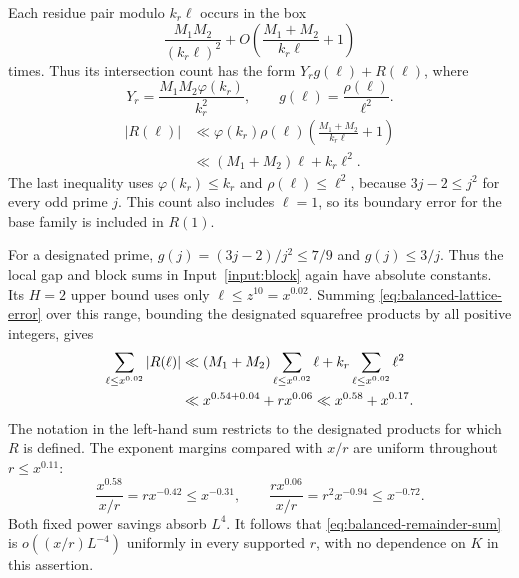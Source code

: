 Each residue pair modulo $k_r\ell$ occurs in the box
\[
 \frac{M_1M_2}{(k_r\ell)^2}
     +O\left(\frac{M_1+M_2}{k_r\ell}+1\right)
\]
times.  Thus its intersection count has the form $Y_rg(\ell)+R(\ell)$,
where
\begin{equation}\label{eq:balanced-sieve-data}
 Y_r=\frac{M_1M_2\varphi(k_r)}{k_r^2},
 \qquad g(\ell)=\frac{\rho(\ell)}{\ell^2}.
\end{equation}
\begin{equation}\label{eq:balanced-lattice-error}
 \begin{split}
 |R(\ell)|
 &\ll\varphi(k_r)\rho(\ell)
       \left(\frac{M_1+M_2}{k_r\ell}+1\right)\\
 &\ll (M_1+M_2)\ell+k_r\ell^2.
 \end{split}
\end{equation}
The last inequality uses $\varphi(k_r)\le k_r$ and
$\rho(\ell)\le\ell^2$, because $3j-2\le j^2$ for every odd prime
$j$.  This count also includes $\ell=1$, so its boundary error for
the base family is included in $R(1)$.

For a designated prime,
$g(j)=(3j-2)/j^2\le7/9$ and $g(j)\le3/j$.  Thus the local gap and
block sums in Input~\ref{input:block} again have absolute constants.
Its $H=2$ upper bound uses only $\ell\le z^{10}=x^{0.02}$.
Summing \eqref{eq:balanced-lattice-error} over this range, bounding
the designated squarefree products by all positive integers, gives
\begin{align}
 \sum_{\ell\le x^{0.02}}|R(\ell)|
 &\ll (M_1+M_2)\sum_{\ell\le x^{0.02}}\ell
        +k_r\sum_{\ell\le x^{0.02}}\ell^2\notag\\
 &\ll x^{0.54+0.04}+r x^{0.06}
 \ll x^{0.58}+x^{0.17}.\label{eq:balanced-remainder-sum}
\end{align}
The notation in the left-hand sum restricts to the designated
products for which $R$ is defined.  The exponent margins compared
with $x/r$ are uniform throughout $r\le x^{0.11}$:
\[
 \frac{x^{0.58}}{x/r}=r x^{-0.42}\le x^{-0.31},
 \qquad
 \frac{r x^{0.06}}{x/r}=r^2x^{-0.94}\le x^{-0.72}.
\]
Both fixed power savings absorb $L^4$.  It follows that
\eqref{eq:balanced-remainder-sum} is $o((x/r)L^{-4})$ uniformly in
every supported $r$, with no dependence on $K$ in this assertion.

